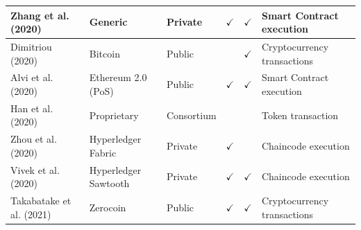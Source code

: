 \documentclass[../access.tex]{subfiles}
\begin{document}
\begin{table}[htbp]
\begin{adjustwidth}{-1cm}{}
\begin{tabular}{m{4.4cm} >{\centering\arraybackslash}m{2.9cm} >{\centering\arraybackslash}m{1.0cm} >{\centering\arraybackslash}m{1.0cm} >{\centering\arraybackslash}m{1.5cm} >{\centering\arraybackslash}m{3.6cm}}
            \hline
            \footnotesize{Zhang et al. (2020) \cite{Zhang2020}}            & \footnotesize{Generic}                         & \footnotesize{Private}                           & $ \checkmark $                                         & $ \checkmark $                                        & \footnotesize{Smart Contract execution}    \\
            \hline
            \footnotesize{Dimitriou (2020) \cite{Dimitriou2020}}           & \footnotesize{Bitcoin}                         & \footnotesize{Public}                            & {}                                                     & $ \checkmark $                                        & \footnotesize{Cryptocurrency transactions} \\
            \hline
            \footnotesize{Alvi et al. (2020) \cite{Alvi2020}}              & \footnotesize{Ethereum 2.0 (PoS)}              & \footnotesize{Public}                            & $ \checkmark $                                         & $ \checkmark $                                        & \footnotesize{Smart Contract execution}    \\
            \hline
            \footnotesize{Han et al. (2020) \cite{Han2020}}                & \footnotesize{Proprietary}                     & \footnotesize{Consortium}                        & {}                                                     & {}                                                    & \footnotesize{Token transaction}           \\
            \hline
            \footnotesize{Zhou et al. (2020) \cite{Zhou2020}}              & \footnotesize{Hyperledger Fabric}              & \footnotesize{Private}                           & $ \checkmark $                                         & {}                                                    & \footnotesize{Chaincode execution}         \\
            \hline
            \footnotesize{Vivek et al. (2020) \cite{Vivek2020}}            & \footnotesize{Hyperledger Sawtooth}            & \footnotesize{Private}                           & $ \checkmark $                                         & $ \checkmark $                                        & \footnotesize{Chaincode execution}         \\
            \hline
            \footnotesize{Takabatake et al. (2021) \cite{Takabatake2021}}  & \footnotesize{Zerocoin}                        & \footnotesize{Public}                            & $ \checkmark $                                         & $ \checkmark $                                        & \footnotesize{Cryptocurrency transactions} \\

\end{tabular}
\end{adjustwidth}
\end{table}
\end{document}
